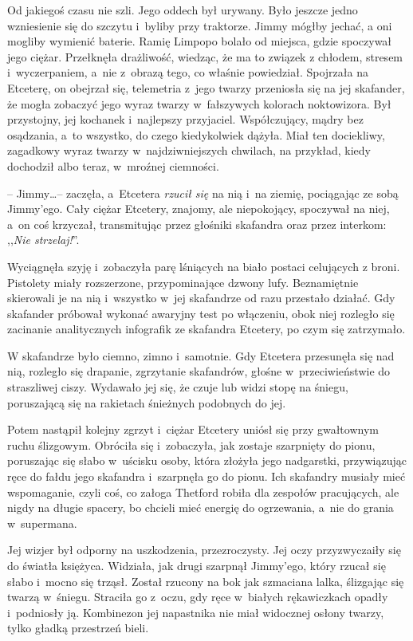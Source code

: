 \documentclass[oneside,polish,11pt,sfheadings]{mwbk}
\begin{document}
Od jakiegoś czasu nie szli. Jego oddech był urywany. Było jeszcze jedno
wzniesienie się do szczytu i~byliby przy traktorze. Jimmy mógłby jechać,
a oni mogliby wymienić baterie. Ramię Limpopo bolało od miejsca, gdzie
spoczywał jego ciężar. Przełknęła drażliwość, wiedząc, że ma to związek
z chłodem, stresem i~wyczerpaniem, a~nie z~obrazą tego, co właśnie
powiedział. Spojrzała na Etceterę, on obejrzał się, telemetria z~jego
twarzy przeniosła się na jej skafander, że mogła zobaczyć jego wyraz
twarzy w~fałszywych kolorach noktowizora. Był przystojny, jej kochanek i~najlepszy przyjaciel. Współczujący, mądry bez osądzania, a~to wszystko,
do czego kiedykolwiek dążyła. Miał ten dociekliwy, zagadkowy wyraz
twarzy w~najdziwniejszych chwilach, na przykład, kiedy dochodził albo
teraz, w~mroźnej ciemności.

-- Jimmy\ldots  -- zaczęła, a~Etcetera \textit{rzucił się} na nią i~na ziemię,
pociągając ze sobą Jimmy'ego. Cały ciężar Etcetery, znajomy, ale
niepokojący, spoczywał na niej, a~on coś krzyczał, transmitując przez
głośniki skafandra oraz przez interkom: ,,\textit{Nie strzelaj!}''.

Wyciągnęła szyję i~zobaczyła parę lśniących na biało postaci celujących
z broni. Pistolety miały rozszerzone, przypominające dzwony lufy.
Beznamiętnie skierowali je na nią i~wszystko w~jej skafandrze od razu
przestało działać. Gdy skafander próbował wykonać awaryjny test po
włączeniu, obok niej rozległo się zacinanie analitycznych infografik ze
skafandra Etcetery, po czym się zatrzymało.

W skafandrze było ciemno, zimno i~samotnie. Gdy Etcetera przesunęła się
nad nią, rozległo się drapanie, zgrzytanie skafandrów, głośne w~przeciwieństwie do straszliwej ciszy. Wydawało jej się, że czuje lub
widzi stopę na śniegu, poruszającą się na rakietach śnieżnych podobnych
do jej.

Potem nastąpił kolejny zgrzyt i~ciężar Etcetery uniósł się przy
gwałtownym ruchu ślizgowym. Obróciła się i~zobaczyła, jak zostaje
szarpnięty do pionu, poruszając się słabo w~uścisku osoby, która złożyła
jego nadgarstki, przywiązując ręce do fałdu jego skafandra i~szarpnęła
go do pionu. Ich skafandry musiały mieć wspomaganie, czyli coś, co
załoga Thetford robiła dla zespołów pracujących, ale nigdy na długie
spacery, bo chcieli mieć energię do ogrzewania, a~nie do grania w~supermana.

Jej wizjer był odporny na uszkodzenia, przezroczysty. Jej oczy
przyzwyczaiły się do światła księżyca. Widziała, jak drugi szarpnął
Jimmy'ego, który rzucał się słabo i~mocno się trząsł. Został rzucony na
bok jak szmaciana lalka, ślizgając się twarzą w~śniegu. Straciła go z~oczu, gdy ręce w~białych rękawiczkach opadły i~podniosły ją. Kombinezon
jej napastnika nie miał widocznej osłony twarzy, tylko gładką przestrzeń
bieli.
\end{document}
